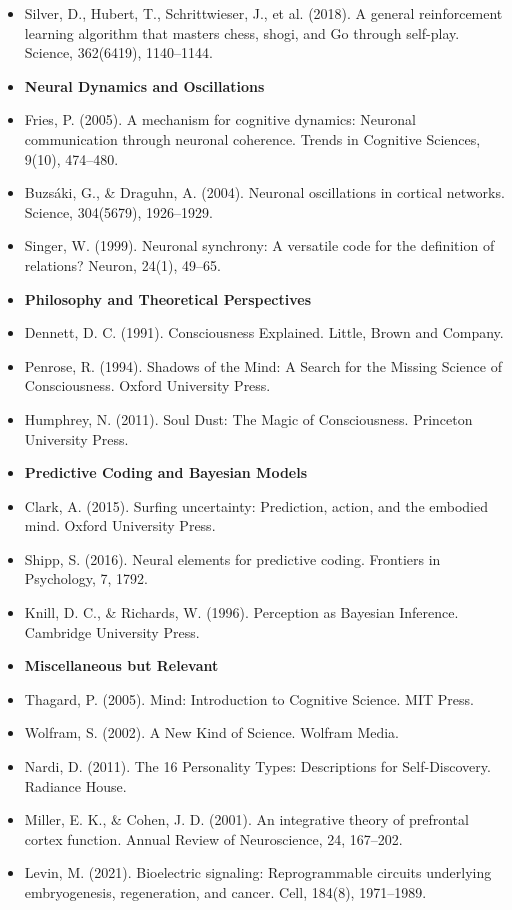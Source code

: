 \documentclass[american,11pt,letterpaper]{article}
\begin{document}
\begin{itemize}
\item Silver, D., Hubert, T., Schrittwieser, J., et al. (2018). A general reinforcement learning algorithm that masters chess, shogi, and Go through self-play. Science, 362(6419), 1140--1144.
\item[] \textbf{Neural Dynamics and Oscillations}
\item Fries, P. (2005). A mechanism for cognitive dynamics: Neuronal communication through neuronal coherence. Trends in Cognitive Sciences, 9(10), 474--480.
\item Buzs\'aki, G., \& Draguhn, A. (2004). Neuronal oscillations in cortical networks. Science, 304(5679), 1926--1929.
\item Singer, W. (1999). Neuronal synchrony: A versatile code for the definition of relations? Neuron, 24(1), 49--65.
\item[] \textbf{Philosophy and Theoretical Perspectives}
\item Dennett, D. C. (1991). Consciousness Explained. Little, Brown and Company.
\item Penrose, R. (1994). Shadows of the Mind: A Search for the Missing Science of Consciousness. Oxford University Press.
\item Humphrey, N. (2011). Soul Dust: The Magic of Consciousness. Princeton University Press.
\item[] \textbf{Predictive Coding and Bayesian Models}
\item Clark, A. (2015). Surfing uncertainty: Prediction, action, and the embodied mind. Oxford University Press.
\item Shipp, S. (2016). Neural elements for predictive coding. Frontiers in Psychology, 7, 1792.
\item Knill, D. C., \& Richards, W. (1996). Perception as Bayesian Inference. Cambridge University Press.
\item[] \textbf{Miscellaneous but Relevant}
\item Thagard, P. (2005). Mind: Introduction to Cognitive Science. MIT Press.
\item Wolfram, S. (2002). A New Kind of Science. Wolfram Media.
\item Nardi, D. (2011). The 16 Personality Types: Descriptions for Self-Discovery. Radiance House.
\item Miller, E. K., \& Cohen, J. D. (2001). An integrative theory of prefrontal cortex function. Annual Review of Neuroscience, 24, 167--202.
\item Levin, M. (2021). Bioelectric signaling: Reprogrammable circuits underlying embryogenesis, regeneration, and cancer. Cell, 184(8), 1971--1989.

\end{itemize}
\end{document}
